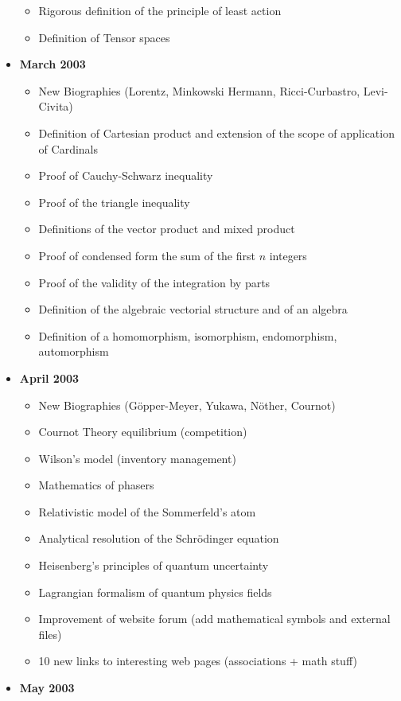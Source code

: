 \documentclass[12pt,a4paper,twoside,openright]{report}
\newcounter{def}
\theoremstyle{definition}
\theoremstyle{itexmp}
\numberwithin{equation}{section}
\begin{document}
\begin{itemize}
\begin{itemize}[noitemsep]
			\item Rigorous definition of the principle of least action
			\item Definition of Tensor spaces
			\end{itemize}
	\item \textbf{March 2003}
		\begin{itemize}[noitemsep]
			\item New Biographies (Lorentz, Minkowski Hermann, Ricci-Curbastro, Levi-Civita)
			\item Definition of Cartesian product and extension of the scope of application of Cardinals
			\item Proof of Cauchy-Schwarz inequality
			\item Proof of the triangle inequality 
			\item Definitions of the vector product and mixed product 
			\item Proof of condensed form the sum of the first $n$ integers 
			\item Proof of the validity of the integration by parts 
			\item Definition of the algebraic vectorial structure and of an algebra 
			\item Definition of a homomorphism, isomorphism, endomorphism, automorphism
		\end{itemize}
	\item \textbf{April 2003}
		\begin{itemize}[noitemsep]
			\item New Biographies (Göpper-Meyer, Yukawa, Nöther, Cournot)
			\item Cournot Theory equilibrium (competition)
			\item Wilson's model (inventory management)
			\item Mathematics of phasers
			\item Relativistic model of the Sommerfeld's atom
			\item Analytical resolution of the Schrödinger equation
			\item Heisenberg's principles of quantum  uncertainty
			\item Lagrangian formalism of quantum physics fields
			\item Improvement of website forum (add mathematical symbols and external files)
			\item 10 new links to interesting web pages (associations + math stuff)
		\end{itemize}
	\item \textbf{May 2003}

\end{itemize}
\end{document}
